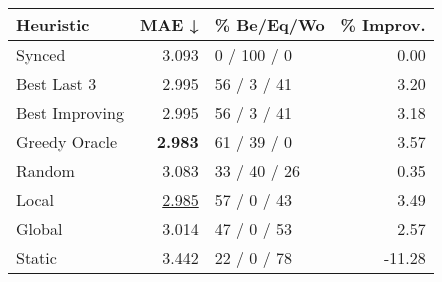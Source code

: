\begin{tabular}{lrlr}
\toprule
\textbf{Heuristic} & \textbf{MAE ↓} & \textbf{\% Be/Eq/Wo} & \textbf{\% Improv.} \\
\midrule
            Synced &          3.093 &          0 / 100 / 0 &                0.00 \\
\midrule
       Best Last 3 &          2.995 &          56 / 3 / 41 &                3.20 \\
    Best Improving &          2.995 &          56 / 3 / 41 &                3.18 \\
\addlinespace
     Greedy Oracle &          \textbf{2.983} &          61 / 39 / 0 &                3.57 \\
            Random &          3.083 &         33 / 40 / 26 &                0.35 \\
\midrule
             Local &          \underline{2.985} &          57 / 0 / 43 &                3.49 \\
            Global &          3.014 &          47 / 0 / 53 &                2.57 \\
\midrule
            Static &          3.442 &          22 / 0 / 78 &              -11.28 \\
\bottomrule
\end{tabular}

\label{tab:ds_non_lr01_le2_bs2_Summary}
